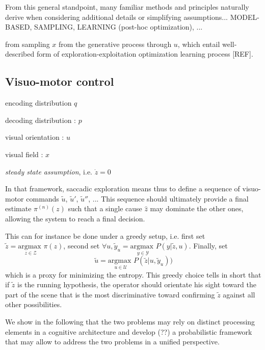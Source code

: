 \documentclass{article} %
\begin{document}
{\color{green} From this general standpoint, many familiar methods and principles naturally derive when considering additional details or simplifying assumptions... MODEL-BASED, SAMPLING, LEARNING (post-hoc optimization), ...}

{\color{green} from sampling $x$ from the generative process through $u$, which entail well-described form of exploration-exploitation optimization learning process [REF].}





\subsection{Visuo-motor control}

encoding distribution $q$

decoding distribution : $p$

visual orientation : $u$

visual field : $x$

\emph{steady state assumption}, i.e. $\dot{z} = 0$




In that framework, saccadic exploration means thus to define a sequence of visuo-motor commands $\tilde{u}$, $\tilde{u}'$, $\tilde{u}''$, ... This sequence should ultimately provide a final estimate $\pi^{(n)}(z)$ such that a single cause $\hat{z}$ may dominate the other ones, allowing the system to reach a final decision.  

{\color{blue}
	This can for instance be done under a greedy setup, i.e. first set $\tilde{z} = \underset{z \in \mathcal{Z}}{\text{argmax }} \pi(z)$, second set $\forall u, \tilde{y}_u = \underset{y \in \mathcal{Y}}{\text{argmax }} P(y|\tilde{z},u)$.
	Finally, set 
	\begin{equation}
	\tilde{u} = \underset{u \in \mathcal{U}}{\text{argmax }}  P(\tilde{z}|u,\tilde{y}_u))
	\end{equation} which is a proxy for minimizing the entropy. This greedy choice tells in short that if $\tilde{z}$ is the running hypothesis, the operator should orientate his sight toward 
	the part of the scene that is the most discriminative toward confirming $\tilde{z}$ against all other possibilities. }
	
	
	
	
	
	{\color{blue} We show in the following that the two problems may rely on distinct processing elements in a cognitive architecture and develop (??) a probabilistic framework that may allow to address the two problems in a unified perspective. }
	
\end{document}
